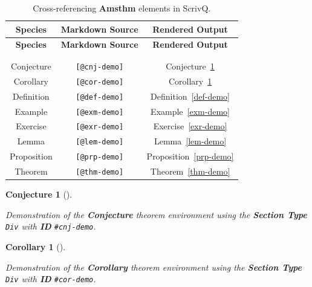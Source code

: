 \documentclass[
  10pt,
  oneside,
  cleardoublepage=empty,
  numbers=noenddot,
  titlepage,
  toclink=all,
  toc=bibliography,
  headinclude,
  footinclude]{scrbook}
\theoremstyle{plain}
\newtheorem{conjecture}{Conjecture}[section]
\theoremstyle{plain}
\theoremstyle{definition}
\theoremstyle{definition}
\theoremstyle{plain}
\theoremstyle{plain}
\theoremstyle{definition}
\theoremstyle{plain}
\newtheorem{corollary}{Corollary}[section]
\theoremstyle{remark}
\begin{document}
\begin{longtable}[]{@{}ccc@{}}
\toprule\noalign{}
\textbf{Species} & \textbf{Markdown Source} & \textbf{Rendered
Output} \\
\midrule\noalign{}
\endfirsthead
\toprule\noalign{}
\textbf{Species} & \textbf{Markdown Source} & \textbf{Rendered
Output} \\
\midrule\noalign{}
\endhead
\bottomrule\noalign{}
\tabularnewline
\caption{Cross-referencing \textbf{Amsthm} elements in
ScrivQ.}\label{tbl-amsthm}\tabularnewline
\endlastfoot
Conjecture & \texttt{{[}@cnj-demo{]}} &
\label{cite_30}{\label{cite_30}Conjecture~\ref{cnj-demo}} \\
Corollary & \texttt{{[}@cor-demo{]}} &
\label{cite_31}{\label{cite_31}Corollary~\ref{cor-demo}} \\
Definition & \texttt{{[}@def-demo{]}} &
\label{cite_32}{\label{cite_32}Definition~\ref{def-demo}} \\
Example & \texttt{{[}@exm-demo{]}} &
\label{cite_33}{\label{cite_33}Example~\ref{exm-demo}} \\
Exercise & \texttt{{[}@exr-demo{]}} &
\label{cite_34}{\label{cite_34}Exercise~\ref{exr-demo}} \\
Lemma & \texttt{{[}@lem-demo{]}} &
\label{cite_35}{\label{cite_35}Lemma~\ref{lem-demo}} \\
Proposition & \texttt{{[}@prp-demo{]}} &
\label{cite_36}{\label{cite_36}Proposition~\ref{prp-demo}} \\
Theorem & \texttt{{[}@thm-demo{]}} &
\label{cite_37}{\label{cite_37}Theorem~\ref{thm-demo}} \\
\end{longtable}

\begin{conjecture}[]\protect\hypertarget{cnj-demo}{}\label{cnj-demo}

Demonstration of the \textbf{Conjecture} theorem environment using the
\textbf{Section Type} \texttt{Div} with \textbf{ID} \texttt{\#cnj-demo}.

\end{conjecture}

\begin{corollary}[]\protect\hypertarget{cor-demo}{}\label{cor-demo}

Demonstration of the \textbf{Corollary} theorem environment using the
\textbf{Section Type} \texttt{Div} with \textbf{ID} \texttt{\#cor-demo}.

\end{corollary}
\end{document}
